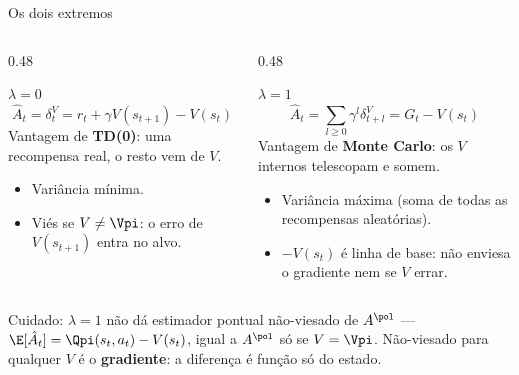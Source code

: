 \documentclass[aspectratio=169, 10pt]{beamer}
\newcommand{\Ahat}{\hat{A}}
\newcommand{\Advpi}{A^{\pol}}
\begin{document}
\begin{frame}{Os dois extremos}

  \begin{columns}[T]
  \begin{column}{0.48\textwidth}
    \begin{teobox}{$\lambda = 0$}
      \[ \Ahat_t = \delta^V_t = r_t + \gamma V(s_{t+1}) - V(s_t) \]
      Vantagem de \textbf{TD(0)}: uma recompensa real, o resto vem de $V$.
      \begin{itemize}
        \item Variância mínima.
        \item \alert{Viés} se $V \ne \Vpi$: o erro de $V(s_{t+1})$ entra no alvo.
      \end{itemize}
    \end{teobox}
  \end{column}
  \begin{column}{0.48\textwidth}
    \begin{teobox}{$\lambda = 1$}
      \[ \Ahat_t = \sum_{l\ge0}\gamma^l\delta^V_{t+l} = G_t - V(s_t) \]
      Vantagem de \textbf{Monte Carlo}: os $V$ internos telescopam e somem.
      \begin{itemize}
        \item Variância máxima (soma de todas as recompensas aleatórias).
        \item $-V(s_t)$ é linha de base: não enviesa o gradiente nem se $V$ errar.
      \end{itemize}
    \end{teobox}
  \end{column}
  \end{columns}

  \begin{alertabox}
    Cuidado: $\lambda=1$ não dá estimador pontual não-viesado de $\Advpi$ ---
    $\E[\Ahat_t] = \Qpi(s_t,a_t) - V(s_t)$, igual a $\Advpi$ só se $V=\Vpi$.
    Não-viesado para qualquer $V$ é o \textbf{gradiente}: a diferença é função só do
    estado.
  \end{alertabox}
\end{frame}
\end{document}
